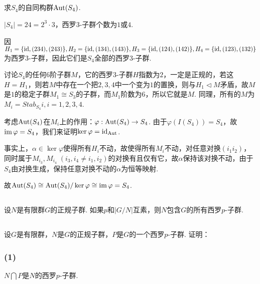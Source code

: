 \subsection{}
求$S_4$的自同构群$\operatorname{Aut}(S_4)$.

\jie
$|S_4|=24=2^3\cdot 3$，西罗$3$-子群个数为$1$或$4$.

因$H_1=\{\operatorname{id},(234),(243)\}, H_2=\{\operatorname{id},(134),(143)\}, H_3=\{\operatorname{id},(124),(142)\}, H_4=\{\operatorname{id},(123),(132)\}$为西罗$3$-子群，因此它们是$S_4$全部的西罗$3$-子群.

讨论$S_4$的任何$6$阶子群$M$，它的西罗$3$-子群$H$指数为$2$，一定是正规的，若这$H=H_1$，则若$M$中存在一个把$2,3,4$中一个变为$1$的置换，则与$H_1\vartriangleleft M$矛盾，故$M$是$1$的稳定子群$M_1\cong S_3$的子群，而$M_1$阶数为$6$，所以它就是$M$. 同理，所有的$M$为$M_i=Stab_{S_4}i, i=1,2,3,4$. 

考虑$\operatorname{Aut}(S_4)$在$M_i$上的作用：$\varphi:\operatorname{Aut}(S_4)\rightarrow S_4$. 由于$\varphi(I(S_4))=S_4$，故$\operatorname{im}\varphi=S_4$，我们来证明$\ker\varphi=\operatorname{id}_{\operatorname{Aut}}$.

事实上，$\alpha\in\ker\varphi$使得所有$H_i$不动，故使得所有$M_i$不动，对任意对换$(i_1i_2)$，同时属于$M_{i_3},M_{i_4}\;(i_3, i_4\neq i_1,i_2)$的对换有且仅有它，故$\alpha$保持该对换不动，由于$S_4$由对换生成，保持任意对换不动的$\alpha$为恒等映射.

故$\operatorname{Aut}(S_4)\cong\operatorname{Aut}(S_4)/\ker\varphi\cong\operatorname{im}\varphi=S_4$.

\subsection{}
设$N$是有限群$G$的正规子群. 如果$p$和$|G/N|$互素，则$N$包含$G$的所有西罗$p$-子群.


\subsection{}
设$G$是有限群，$N$是$G$的正规子群，$P$是$G$的一个西罗$p$-子群. 证明：

\subsubsection{(1)}
$N\bigcap P$是$N$的西罗$p$-子群.

